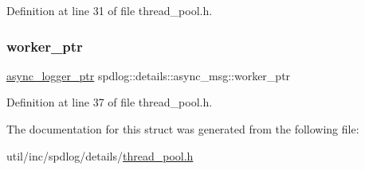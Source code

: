 Definition at line 31 of file thread\+\_\+pool.\+h.

\mbox{\label{structspdlog_1_1details_1_1async__msg_a11f8ca9e84e22b61fca4cd7fe88db5aa}} 
\subsubsection{\texorpdfstring{worker\+\_\+ptr}{worker\_ptr}}
{\footnotesize\ttfamily \hyperlink{namespacespdlog_1_1details_a9b6989c16b6150f7e4658ea2aee01bc2}{async\+\_\+logger\+\_\+ptr} spdlog\+::details\+::async\+\_\+msg\+::worker\+\_\+ptr}



Definition at line 37 of file thread\+\_\+pool.\+h.



The documentation for this struct was generated from the following file\+:\begin{DoxyCompactItemize}
\item 
util/inc/spdlog/details/\hyperlink{thread__pool_8h}{thread\+\_\+pool.\+h}\end{DoxyCompactItemize}
